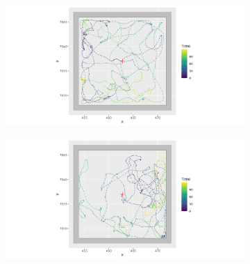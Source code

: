 \documentclass[11pt]{article}
\newcommand {\1}{\mathbb{1}}
\begin{document}
\begin{figure}[H]
 	\begin{subfigure}{0.48\textwidth}
 		\centering
 		\includegraphics[scale=0.35]{images/crcvm/illustrative_sample_rect_standard}
 		\label{fig:illustrativesamplerectstandard}
 	\end{subfigure}
 	\begin{subfigure}{0.48\textwidth}
 		\centering
 		\includegraphics[scale=0.35]{images/crcvm/illustrative_sample_rect_pers}
 		\label{fig:illustrativesamplerectpers}
 	\end{subfigure}
 	

\end{figure}
\end{document}
